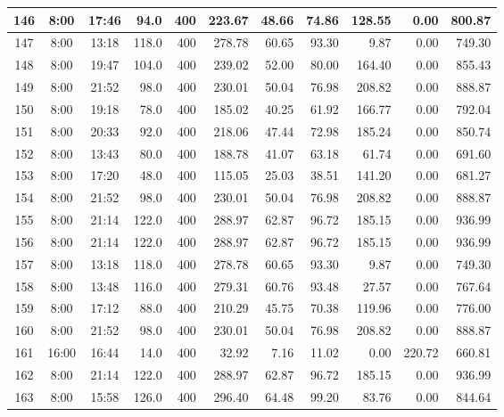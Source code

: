 \begin{landscape}
\begin{longtable}{|c|c|c|r|r|r|r|r|r|r|r|}
\hline
146 & 8:00 & 17:46 & 94.0 & 400 & 223.67 & 48.66 & 74.86 & 128.55 & 0.00 & 800.87 \\
\hline
\rowcolor{gray!8}
147 & 8:00 & 13:18 & 118.0 & 400 & 278.78 & 60.65 & 93.30 & 9.87 & 0.00 & 749.30 \\
\hline
148 & 8:00 & 19:47 & 104.0 & 400 & 239.02 & 52.00 & 80.00 & 164.40 & 0.00 & 855.43 \\
\hline
\rowcolor{gray!8}
149 & 8:00 & 21:52 & 98.0 & 400 & 230.01 & 50.04 & 76.98 & 208.82 & 0.00 & 888.87 \\
\hline
150 & 8:00 & 19:18 & 78.0 & 400 & 185.02 & 40.25 & 61.92 & 166.77 & 0.00 & 792.04 \\
\hline
\rowcolor{gray!8}
151 & 8:00 & 20:33 & 92.0 & 400 & 218.06 & 47.44 & 72.98 & 185.24 & 0.00 & 850.74 \\
\hline
152 & 8:00 & 13:43 & 80.0 & 400 & 188.78 & 41.07 & 63.18 & 61.74 & 0.00 & 691.60 \\
\hline
\rowcolor{gray!8}
153 & 8:00 & 17:20 & 48.0 & 400 & 115.05 & 25.03 & 38.51 & 141.20 & 0.00 & 681.27 \\
\hline
154 & 8:00 & 21:52 & 98.0 & 400 & 230.01 & 50.04 & 76.98 & 208.82 & 0.00 & 888.87 \\
\hline
\rowcolor{gray!8}
155 & 8:00 & 21:14 & 122.0 & 400 & 288.97 & 62.87 & 96.72 & 185.15 & 0.00 & 936.99 \\
\hline
156 & 8:00 & 21:14 & 122.0 & 400 & 288.97 & 62.87 & 96.72 & 185.15 & 0.00 & 936.99 \\
\hline
\rowcolor{gray!8}
157 & 8:00 & 13:18 & 118.0 & 400 & 278.78 & 60.65 & 93.30 & 9.87 & 0.00 & 749.30 \\
\hline
158 & 8:00 & 13:48 & 116.0 & 400 & 279.31 & 60.76 & 93.48 & 27.57 & 0.00 & 767.64 \\
\hline
\rowcolor{gray!8}
159 & 8:00 & 17:12 & 88.0 & 400 & 210.29 & 45.75 & 70.38 & 119.96 & 0.00 & 776.00 \\
\hline
160 & 8:00 & 21:52 & 98.0 & 400 & 230.01 & 50.04 & 76.98 & 208.82 & 0.00 & 888.87 \\
\hline
\rowcolor{gray!8}
161 & 16:00 & 16:44 & 14.0 & 400 & 32.92 & 7.16 & 11.02 & 0.00 & 220.72 & 660.81 \\
\hline
162 & 8:00 & 21:14 & 122.0 & 400 & 288.97 & 62.87 & 96.72 & 185.15 & 0.00 & 936.99 \\
\hline
\rowcolor{gray!8}
163 & 8:00 & 15:58 & 126.0 & 400 & 296.40 & 64.48 & 99.20 & 83.76 & 0.00 & 844.64 \\
\hline
\end{longtable}
\end{landscape}